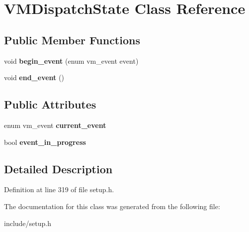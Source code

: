 \hypertarget{classVMDispatchState}{\section{V\-M\-Dispatch\-State Class Reference}
\label{classVMDispatchState}
}
\subsection*{Public Member Functions}
\begin{DoxyCompactItemize}
\item 
\hypertarget{classVMDispatchState_a3a0362f365280487cf9d34390ed0b2dc}{void {\bfseries begin\-\_\-event} (enum vm\-\_\-event event)}\label{classVMDispatchState_a3a0362f365280487cf9d34390ed0b2dc}

\item 
\hypertarget{classVMDispatchState_ac8a6709d68dbc4bf1a460292d52beab0}{void {\bfseries end\-\_\-event} ()}\label{classVMDispatchState_ac8a6709d68dbc4bf1a460292d52beab0}

\end{DoxyCompactItemize}
\subsection*{Public Attributes}
\begin{DoxyCompactItemize}
\item 
\hypertarget{classVMDispatchState_a0a92ac377b1d3e68d8dd3af2c8c433ba}{enum vm\-\_\-event {\bfseries current\-\_\-event}}\label{classVMDispatchState_a0a92ac377b1d3e68d8dd3af2c8c433ba}

\item 
\hypertarget{classVMDispatchState_a46c3a4522f352e7da32a6553fd27a471}{bool {\bfseries event\-\_\-in\-\_\-progress}}\label{classVMDispatchState_a46c3a4522f352e7da32a6553fd27a471}

\end{DoxyCompactItemize}


\subsection{Detailed Description}


Definition at line 319 of file setup.\-h.



The documentation for this class was generated from the following file\-:\begin{DoxyCompactItemize}
\item 
include/setup.\-h\end{DoxyCompactItemize}
